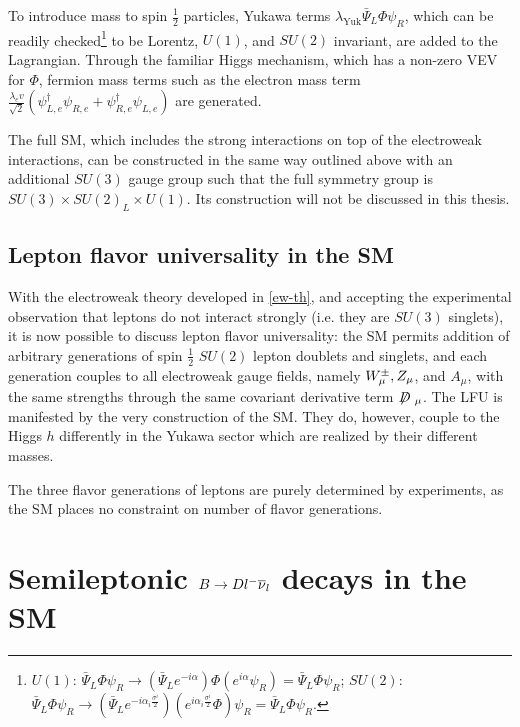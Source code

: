 To introduce mass to spin $\frac{1}{2}$ particles, Yukawa terms
$\lambda_\text{Yuk} \bar{\Psi}_L \Phi \psi_R$,
which can be readily checked\footnote{
    $U(1)$:
    $\bar{\Psi}_L \Phi \psi_R \rightarrow
    (\bar{\Psi}_L e^{-i \alpha}) \Phi (e^{i \alpha} \psi_R)
    = \bar{\Psi}_L \Phi \psi_R$;
    $SU(2)$:
    $\bar{\Psi}_L \Phi \psi_R \rightarrow
    (\bar{\Psi}_L e^{-i \alpha_i \frac{\sigma^i}{2}}) (e^{i \alpha_i \frac{\sigma^i}{2}} \Phi) \psi_R
    = \bar{\Psi}_L \Phi \psi_R$.
} to be Lorentz, $U(1)$, and $SU(2)$ invariant, are added to the Lagrangian.
Through the familiar Higgs mechanism, which has a non-zero VEV for $\Phi$,
fermion mass terms such as the electron mass term
$\frac{\lambda_e v}{\sqrt{2}}({\psi^\dagger_{L,e} \psi_{R,e} + \psi^\dagger_{R,e}\psi_{L,e}})$
are generated.

The full SM,
which includes the strong interactions on top of the electroweak interactions,
can be constructed in the same way outlined above with an additional $SU(3)$
gauge group such that the full symmetry group is
$SU(3) \times SU(2)_L \times U(1)$.
Its construction will not be discussed in this thesis.


\subsection{Lepton flavor universality in the SM}
\label{ref:theory:lfu}

With the electroweak theory developed in \cref{ew-th},
and accepting the experimental observation that leptons do not interact strongly
(i.e. they are $SU(3)$ singlets),
it is now possible to discuss lepton flavor universality:
the SM permits addition of arbitrary generations of spin $\frac{1}{2}$
$SU(2)$ lepton doublets and singlets,
and each generation couples to all electroweak gauge fields,
namely ${W}^\pm_\mu, Z_\mu$, and $A_\mu$,
with the same strengths through the same covariant derivative term
$\fsl{D}_\mu$.
The LFU is manifested by the very construction of the SM.
They do, however, couple to the Higgs $h$ differently in the Yukawa sector which
are realized by their different masses.

The three flavor generations of leptons are purely determined by experiments,
as the SM places no constraint on number of flavor generations.


\section{Semileptonic $B \rightarrow D {l^-}{{\overline{\nu}}_l}$ decays in the SM}

